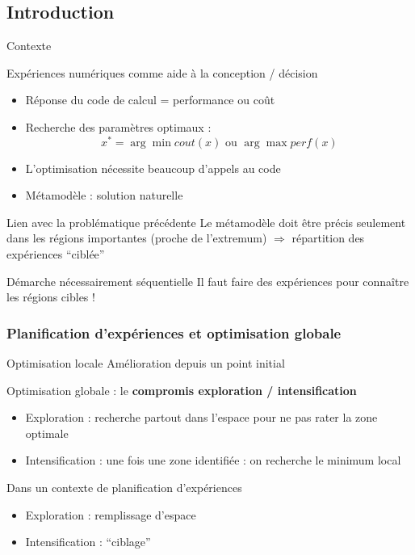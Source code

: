 \subsection{Introduction}
\begin{frame}{Contexte}
\begin{block}{Expériences numériques comme aide à la conception / décision}
 \begin{itemize}
  \item Réponse du code de calcul = performance ou coût
  \item Recherche des paramètres optimaux :
  $$x^* = \arg \min cout(x) \text{ ou } \arg \max {perf(x)}$$
  \item L'optimisation nécessite beaucoup d'appels au code
  \item Métamodèle : solution naturelle
 \end{itemize}
\end{block}

\begin{exampleblock}{Lien avec la problématique précédente}
Le métamodèle doit être précis seulement dans les régions importantes (proche de l'extremum)
$\Rightarrow$ répartition des expériences ``ciblée''
\end{exampleblock}

\begin{alertblock}{Démarche nécessairement séquentielle}
Il faut faire des expériences pour connaître les régions cibles !
\end{alertblock}
\end{frame}
\begin{frame}
  \frametitle{Planification d'expériences et optimisation globale}
  \begin{block}{Optimisation locale}
Amélioration depuis un point initial
  \end{block}

  \begin{block}{Optimisation globale : le \textbf{compromis exploration / intensification}}
  \begin{itemize}
   \item Exploration : recherche partout dans l'espace pour ne pas rater la zone optimale 
   \item Intensification : une fois une zone identifiée : on recherche le minimum local
  \end{itemize}
  \end{block}
  
\begin{exampleblock}{Dans un contexte de planification d'expériences}
  \begin{itemize}
   \item Exploration : remplissage d'espace
   \item Intensification : ``ciblage''
  \end{itemize}
\end{exampleblock}
  
\end{frame}
